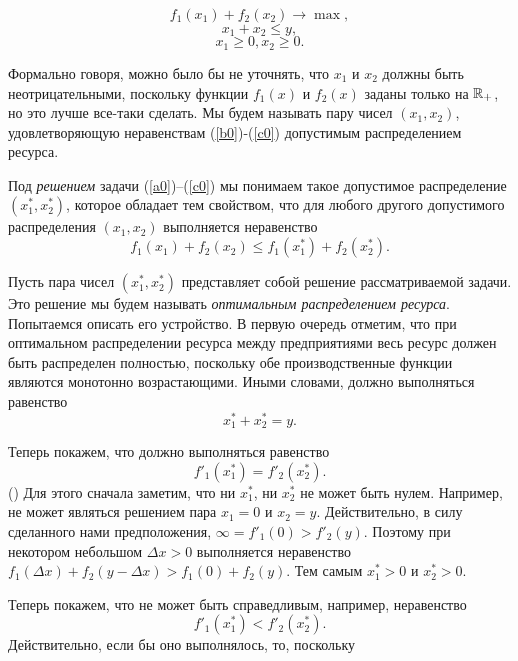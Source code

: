 \begin{equation}
\label{a0} f_{1}(x_{1})+f_{2}(x_{2})\rightarrow\max,
\end{equation}
\begin{equation}
\label{b0}
 x_{1}+x_{2}\leqslant y,
\end{equation}
\begin{equation}
\label{c0}
 x_{1}\geqslant0, x_{2}\geqslant0.
\end{equation}

Формально говоря, можно было бы не уточнять, что $x_{1}$ и $x_{2}$
должны быть неотрицательными, поскольку функции $f_{1}(x)$ и
$f_{2}(x)$ заданы только на $\mathbb{R}_{+}$, но это лучше все-таки сделать.
Мы будем называть пару чисел $(x_{1},x_{2})$, удовлетворяющую
неравенствам (\ref{b0})-(\ref{c0}) допустимым распределением
ресурса.


Под \emph{решением} задачи (\ref{a0})--(\ref{c0}) мы понимаем такое
допустимое распределение $(x_{1}^{*},x_{2}^{*})$, которое обладает
тем свойством, что для любого другого допустимого распределения
$(x_{1},x_{2})$ выполняется неравенство
\[f_{1}(x_{1})+f_{2}(x_{2})\leqslant f_{1}(x^{*}_{1})+f_{2}(x^{*}_{2}).\]

Пусть пара чисел $(x_{1}^{*},x_{2}^{*})$ представляет собой решение
рассматриваемой задачи. Это решение мы будем называть
\emph{оптимальным распределением ресурса}. Попытаемся описать его
устройство. В первую очередь отметим, что при оптимальном
распределении ресурса между предприятиями весь ресурс должен быть
распределен полностью, поскольку обе производственные функции
являются монотонно возрастающими. Иными словами, должно выполняться
равенство
\begin{equation}
\label{a}
x_{1}^{*}+x_{2}^{*}=y.
\end{equation}


Теперь покажем, что должно выполняться равенство
\begin{equation}
\label{b}
f'_{1}(x_{1}^{*})=f'_{2}(x_{2}^{*}).
\end{equation}        ()
Для этого сначала заметим, что ни  $x_{1}^{*}$, ни $x_{2}^{*}$ не может быть нулем. Например,
не может являться решением пара $x_{1}=0$ и $x_{2}=y$. Действительно, в силу сделанного нами
предположения, $\infty=f'_{1}(0)>f'_{2}(y)$. Поэтому при некотором небольшом $\Delta x>0$
выполняется неравенство $f_{1}(\Delta x)+f_{2}(y-\Delta x)>f_{1}(0)+f_{2}(y).$ Тем самым
$x_{1}^{*}>0$ и $x_{2}^{*}>0$.

Теперь покажем, что не может быть справедливым, например,
неравенство \[f'_{1}(x_{1}^{*})<f'_{2}(x_{2}^{*}).\] Действительно,
если бы оно выполнялось, то, поскольку

